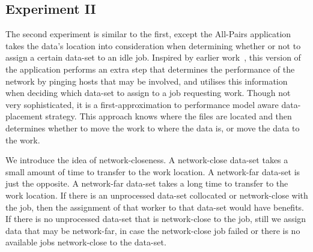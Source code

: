 \documentclass{rspublic}
\begin{document}
 

\subsection{Experiment II} The second experiment is similar to the
first, except the All-Pairs application takes the data's location into
consideration when determining whether or not to assign a certain
data-set to an idle job.  Inspired by earlier work~\citep{netperf},
this version of the application performs an extra step that determines
the performance of the network by pinging hosts that may be involved,
and utilises this information when deciding which data-set to assign
to a job requesting work.  Though not very sophisticated, it is a
first-approximation to performance model aware data-placement strategy.
This approach knows where the files are located and then determines
whether to move the work to where the data is, or move the data to the
work.  

We introduce the idea of network-closeness.  A network-close data-set
takes a small amount of time to transfer to the work location.  A
network-far data-set is just the opposite.  A network-far data-set takes
a long time to transfer to the work location.  If there is an
unprocessed data-set collocated or network-close with the job, then the
assignment of that worker to that data-set would have benefits.  If
there is no unprocessed data-set that is network-close to the job, still
we assign data that may be network-far, in case the network-close job
failed or there is no available jobs network-close to the data-set.

\end{document}
